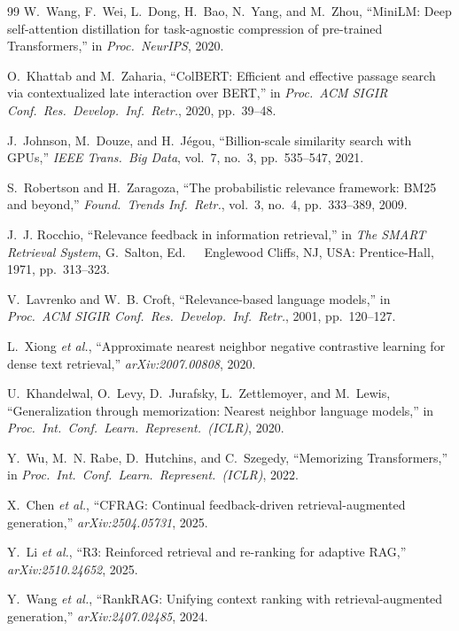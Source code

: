 \documentclass[journal]{IEEEtran}
\begin{document}
\begin{thebibliography}{99}
W.~Wang, F.~Wei, L.~Dong, H.~Bao, N.~Yang, and M.~Zhou,
``MiniLM: Deep self-attention distillation for task-agnostic
compression of pre-trained Transformers,''
in \emph{Proc.\ NeurIPS}, 2020.

O.~Khattab and M.~Zaharia,
``ColBERT: Efficient and effective passage search via contextualized
late interaction over BERT,''
in \emph{Proc.\ ACM SIGIR Conf.\ Res.\ Develop.\ Inf.\ Retr.}, 2020,
pp.~39--48.

J.~Johnson, M.~Douze, and H.~J{\'e}gou,
``Billion-scale similarity search with GPUs,''
\emph{IEEE Trans.\ Big Data}, vol.~7, no.~3, pp.~535--547, 2021.

S.~Robertson and H.~Zaragoza,
``The probabilistic relevance framework: BM25 and beyond,''
\emph{Found.\ Trends Inf.\ Retr.}, vol.~3, no.~4, pp.~333--389, 2009.

J.~J. Rocchio,
``Relevance feedback in information retrieval,''
in \emph{The SMART Retrieval System}, G.~Salton, Ed.\ \ \
Englewood Cliffs, NJ, USA: Prentice-Hall, 1971, pp.~313--323.

V.~Lavrenko and W.~B. Croft,
``Relevance-based language models,''
in \emph{Proc.\ ACM SIGIR Conf.\ Res.\ Develop.\ Inf.\ Retr.}, 2001,
pp.~120--127.

L.~Xiong \emph{et al.},
``Approximate nearest neighbor negative contrastive learning for dense
text retrieval,''
\emph{arXiv:2007.00808}, 2020.

U.~Khandelwal, O.~Levy, D.~Jurafsky, L.~Zettlemoyer, and M.~Lewis,
``Generalization through memorization: Nearest neighbor language
models,''
in \emph{Proc.\ Int.\ Conf.\ Learn.\ Represent.\ (ICLR)}, 2020.

Y.~Wu, M.~N. Rabe, D.~Hutchins, and C.~Szegedy,
``Memorizing Transformers,''
in \emph{Proc.\ Int.\ Conf.\ Learn.\ Represent.\ (ICLR)}, 2022.

X.~Chen \emph{et al.},
``CFRAG: Continual feedback-driven retrieval-augmented generation,''
\emph{arXiv:2504.05731}, 2025.

Y.~Li \emph{et al.},
``R3: Reinforced retrieval and re-ranking for adaptive RAG,''
\emph{arXiv:2510.24652}, 2025.

Y.~Wang \emph{et al.},
``RankRAG: Unifying context ranking with retrieval-augmented
generation,''
\emph{arXiv:2407.02485}, 2024.


\end{thebibliography}
\end{document}
